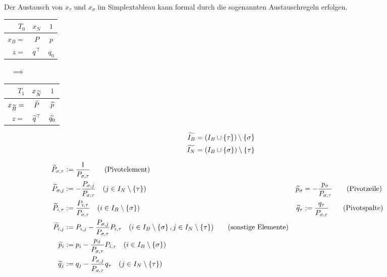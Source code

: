 Der Austausch von $x_\tau$ und $x_\sigma$ im Simplextableau kann formal durch die sogenannten Austauschregeln erfolgen.

\begin{center}
	\begin{minipage}{\dimexpr0.6\linewidth-\fboxrule-\fboxsep}
		\centering
		\begin{tabular}{r|c|c}
			$T_0$ & $x_N$ & $1$ \\ \hline
			$x_B = $ & $P$ & $p$ \\ \hline
			$z =$ & $q^{\top}$ & $q_0$
		\end{tabular}
		$\quad \implies \quad$
		\begin{tabular}{r|c|c}
			$T_1$ & $x_{\widetilde{N}}$ & $1$ \\ \hline
			$x_{\widetilde{B}} = $ & $\widetilde{P}$ & $\widetilde{p}$ \\ \hline
			$z =$ & $\widetilde{q}^{\top}$ & $\widetilde{q_0}$
		\end{tabular}
	\end{minipage}
	\begin{minipage}{\dimexpr0.4\linewidth-\fboxrule-\fboxsep}
		\begin{equation*}
			\begin{aligned}
			\widetilde{I_B} &= \left( I_B \cup \left\{ \tau \right\} \right) \setminus \left\{ \sigma \right\} \\
			\widetilde{I_N} &= \left( I_B \cup \left\{ \sigma \right\} \right) \setminus \left\{ \tau \right\}
			\end{aligned}
		\end{equation*}
	\end{minipage}
\end{center}
\vspace{\parskip}

\begin{align*}
	\widetilde{P}_{\sigma , \tau} &\mathrel{:=} \frac{1}{P_{\sigma,  \tau}} 
	\tag{Pivotelement} \\
	\widetilde{P}_{\sigma, j} &\mathrel{:=} - \frac{P_{\sigma, j}}{P_{\sigma, \tau}} \quad (j \in I_N \setminus \left\{ \tau \right\}) & \widetilde{p}_\sigma &= - \frac{p_\sigma}{P_{\sigma, \tau}} 
	\tag{Pivotzeile} \\
	\widetilde{P}_{i, \tau} &\mathrel{:=} \frac{P_{i, \tau}}{P_{\sigma, \tau}} \quad (i \in I_B \setminus \left\{ \sigma \right\}) & \widetilde{q}_\tau &\mathrel{:=} \frac{q_\tau}{P_{\sigma, \tau}}
	\tag{Pivotspalte} \\
	\widetilde{P}_{i,j} &\mathrel{:=} P_{i,j} - \frac{P_{\sigma, j}}{P_{\sigma, \tau}} P_{i,\tau} \quad (i \in I_B \setminus \left\{ \sigma \right\} , j \in I_N \setminus \left\{ \tau \right\}) 
	\tag{sonstige Elemente}\\
	\widetilde{p}_i &\mathrel{:=} p_i - \frac{p_\sigma}{P_{\sigma, \tau}} P_{i,\tau} \quad (i \in I_B \setminus \left\{ \sigma \right\}) \\
	\widetilde{q}_j &\mathrel{:=} q_j - \frac{P_{\sigma, j}}{P_{\sigma, \tau}} q_\tau \quad (j \in I_N \setminus \left\{ \tau \right\}) \\
\end{align*}

